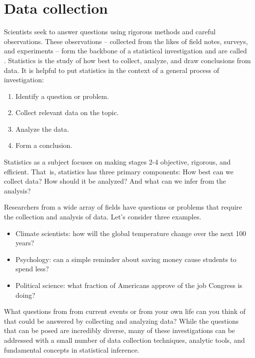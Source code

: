 \chapter{Data collection}
\label{introductionToData}


Scientists seek to answer questions using rigorous methods and careful observations. These observations -- collected from the likes of field notes, surveys, and experiments -- form the backbone of a statistical investigation and are called . Statistics is the study of how best to collect, analyze, and draw conclusions from data. It is helpful to put statistics in the context of a general process of investigation:
\begin{enumerate}
\setlength{\itemsep}{0mm}
\item Identify a question or problem.
\item Collect relevant data on the topic.
\item Analyze the data.
\item Form a conclusion.
\end{enumerate}

Statistics as a subject focuses on making stages 2-4 objective, rigorous, and efficient. That~is, statistics has three primary components: How best can we collect data? How should it be analyzed? And what can we infer from the analysis?

Researchers from a wide array of fields have questions or problems that require the collection and analysis of data. Let's consider three examples.
\begin{itemize}
\setlength{\itemsep}{0mm}
\item Climate scientists: how will the global temperature change over the next 100 years?
\item Psychology: can a simple reminder about saving money cause students to spend less?
\item Political science: what fraction of Americans approve of the job Congress is doing?
\end{itemize}
What questions from from current events or from your own life can you think of that could be answered by collecting and analyzing data? While the questions that can be posed are incredibly diverse, many of these investigations can be addressed with a small number of data collection techniques, analytic tools, and fundamental concepts in statistical inference.

